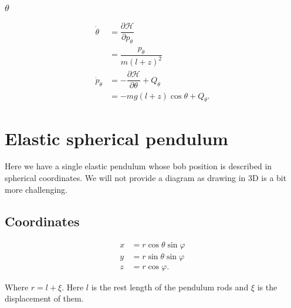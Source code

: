 \documentclass[12pt,a4paper,portrait]{article}
\newcommand{\ham}{\mathcal{H}}
\begin{document}
\subsubsection{$\theta$}
\begin{align*}
	\dot{\theta} &= \dfrac{\partial \ham}{\partial p_{\theta}} \\
	&= \dfrac{p_{\theta}}{m(l+z)^2} \\
	\dot{p}_{\theta} &= -\dfrac{\partial \ham}{\partial \theta} + Q_{\theta} \\
	&= -mg(l+z)\cos{\theta} + Q_{\theta}.
\end{align*}

\section{Elastic spherical pendulum}
Here we have a single elastic pendulum whose bob position is described in spherical coordinates. We will not provide a diagram as drawing in 3D is a bit more challenging.

\subsection{Coordinates}
\begin{align*}
	x &= r\cos{\theta}\sin{\varphi}\\
	y &= r\sin{\theta}\sin{\varphi} \\
	z &= r\cos{\varphi}.
\end{align*}

Where $r = l + \xi$. Here $l$ is the rest length of the pendulum rods and $\xi$ is the displacement of them. 
\end{document}
